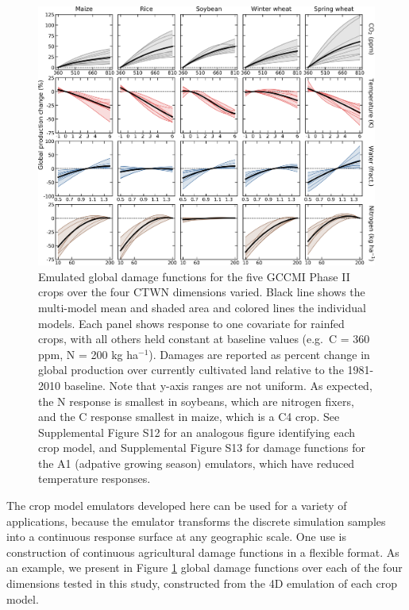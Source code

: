 \documentclass[gmdd]{copernicus} %
\begin{document}
\begin{figure}[h!]
  \centering
  \includegraphics[width = 16.3cm]{figures/em_CTWN_all_crops.png}
  \caption{
  Emulated global damage functions for the five GCCMI Phase II crops over the four CTWN dimensions varied. %
  Black line shows the multi-model mean and shaded area and colored lines the individual models. 
  Each panel shows response to one covariate for rainfed crops, with all others held constant at baseline values (e.g.\ C = 360 ppm, N = 200 kg ha$^{-1}$). 
  Damages are reported as percent change in global production over currently cultivated land relative to the 1981-2010 baseline. Note that y-axis ranges are not uniform.
  As expected, the N response is smallest in soybeans, which are nitrogen fixers, and the C response smallest in maize, which is a C4 crop. %
 See Supplemental Figure S12 for an analogous figure identifying each crop model, and Supplemental Figure S13 for damage functions for the A1 (adpative growing season) emulators, which have reduced temperature responses.
  }
  \label{fig:all_dims}
\end{figure}

The crop model emulators developed here can be used for a variety of applications, because the emulator transforms the discrete simulation samples into a continuous response surface at any geographic scale. One use is construction of continuous agricultural damage functions in a flexible format. 
As an example, we present in  Figure \ref{fig:all_dims} global damage functions over each of the four dimensions tested in this study, constructed from the 4D emulation of each crop model. %
\end{document}
